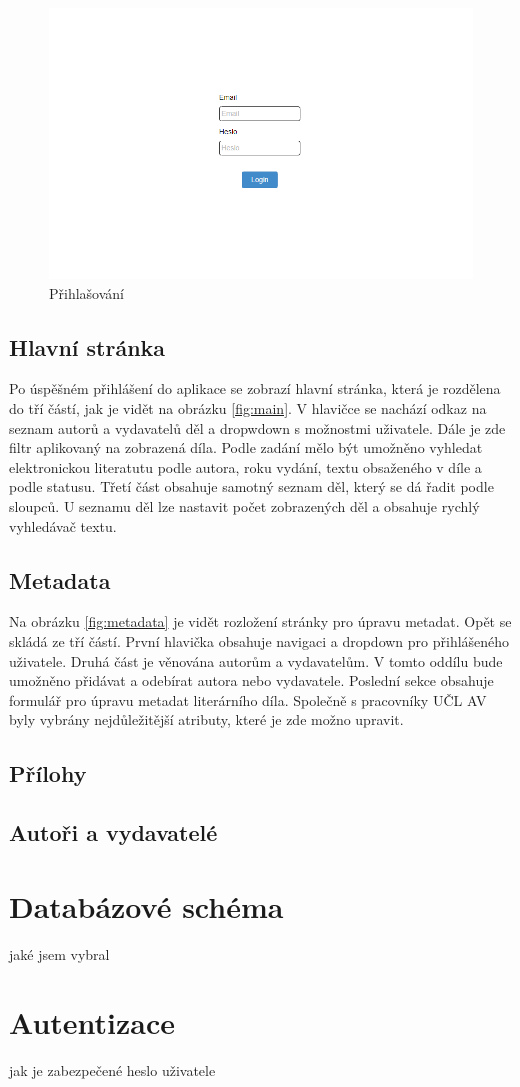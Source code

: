             \begin {figure}[H]\centering
                \includegraphics[width=\textwidth]{images/login}
                \caption {Přihlašování}
                \label {fig:login}
            \end{figure}
            
        \subsection{Hlavní stránka}
            Po úspěšném přihlášení do aplikace se zobrazí hlavní stránka, která je rozdělena do tří částí, jak je vidět na obrázku \ref{fig:main}. V hlavičce se nachází odkaz na seznam autorů a vydavatelů děl a dropwdown s možnostmi uživatele. Dále je zde filtr aplikovaný na zobrazená díla. Podle zadání mělo být umožněno vyhledat elektronickou literatutu podle autora, roku vydání, textu obsaženého v díle a podle statusu. Třetí část obsahuje samotný seznam děl, který se dá řadit podle sloupců. U seznamu děl lze nastavit počet zobrazených děl a obsahuje rychlý vyhledávač textu.

        \subsection{Metadata}
            Na obrázku \ref{fig:metadata} je vidět rozložení stránky pro úpravu metadat. Opět se skládá ze tří částí. První hlavička obsahuje navigaci a dropdown pro přihlášeného uživatele. Druhá část je věnována autorům a vydavatelům. V tomto oddílu bude umožněno přidávat a odebírat autora nebo vydavatele. Poslední sekce obsahuje formulář pro úpravu metadat literárního díla. Společně s pracovníky UČL AV byly vybrány nejdůležitější atributy, které je zde možno upravit. 
        
        \subsection{Přílohy}
        
        \subsection{Autoři a vydavatelé}

    \section{Databázové schéma}
        jaké jsem vybral
        
    \section{Autentizace}
        jak je zabezpečené heslo uživatele
